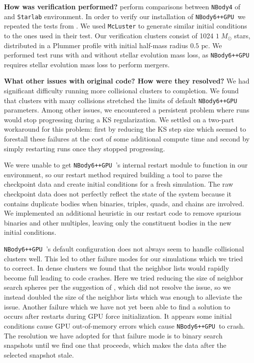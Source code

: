 \documentclass[preprint1]{aastex}
\newcommand\Msun{\; M_\odot}
\newcommand\pc{\mbox{ pc}}
\newcommand\nbody{\texttt{NBody6++GPU }}
\numberwithin{equation}{section}
\begin{document}
\textbf{How was verification performed?}
\citet{2009Anders, 2012Anders} perform comparisons between \texttt{NBody4} of \citet{1999Aarseth} and \texttt{Starlab} environment.  In order to verify our installation of \nbody we repeated the tests from \citet{2009Anders}.  We used \texttt{McLuster} to generate similar initial conditions to the ones used in their test. Our verification clusters consist of 1024 $1 \Msun$ stars, distributed in a Plummer profile with initial half-mass radius $0.5 \pc$.  We performed test runs with and without stellar evolution mass loss, as \nbody requires stellar evolution mass loss to perform mergers.

\textbf{What other issues with original code?  How were they resolved?}
We had significant difficulty running more collisional clusters to completion.  We found that clusters with many collisions stretched the limits of default \nbody parameters.  Among other issues, we encountered a persistent problem where runs would stop progressing during a KS regularization.  We settled on a two-part workaround for this problem: first by reducing the KS step size which seemed to forestall these failures at the cost of some additional compute time and second by simply restarting runs once they stopped progressing. 

We were unable to get \nbody's internal restart module to function in our environment, so our restart method required building a tool to parse the checkpoint data and create initial conditions for a fresh simulation.  The raw checkpoint data does not perfectly reflect the state of the system because it contains duplicate bodies when binaries, triples, quads, and chains are involved. We implemented an additional heuristic in our restart code to remove spurious binaries and other multiples, leaving only the constituent bodies in the new initial conditions.

\nbody's default configuration does not always seem to handle collisional clusters well.  This led to other failure modes for our simulations which we tried to correct.  In dense clusters we found that the neighbor lists would rapidly become full leading to code crashes.  Here we tried reducing the size of neighbor search spheres per the suggestion of \citet[][personal communication]{2017Wang}, which did not resolve the issue, so we instead doubled the size of the neighbor lists which was enough to alleviate the issue. Another failure which we have not yet been able to find a solution to occurs after restarts during GPU force initialization.  It appears some initial conditions cause GPU out-of-memory errors which cause \nbody to crash.  The resolution we have adopted for that failure mode is to binary search snapshots until we find one that proceeds, which makes the data after the selected snapshot stale.
\end{document}
